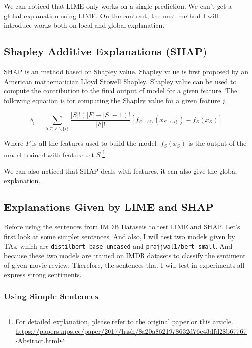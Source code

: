 \documentclass{article}[12pt]
\begin{document}
We can noticed that LIME only works on a single prediction. We can't get a global explanation using LIME. On the contrast, the next method I will introduce works both on local and global explanation.

\subsection{Shapley Additive Explanations (SHAP)}

SHAP is an method based on Shapley value. Shapley value is first proposed by an American mathematician Lloyd Stowell Shapley. Shapley value can be used to compute the contribution to the final output of model for a given feature. The following equation is for computing the Shapley value for a given feature $j$.

\begin{equation}
\phi_{i}=\sum_{S \subseteq F \backslash\{i\}} \frac{|S| !(|F|-|S|-1) !}{|F| !}\left[f_{S \cup\{i\}}\left(x_{S \cup\{i\}}\right)-f_{S}\left(x_{S}\right)\right]
\end{equation}

Where $F$ is all the features used to build the model. $f_{S}(x_{S})$ is the output of the model trained with feature set $S$.\footnote{For detailed explanation, please refer to the original paper or this article. \url{https://papers.nips.cc/paper/2017/hash/8a20a8621978632d76c43dfd28b67767-Abstract.html}}

We can also noticed that SHAP deals with features, it can also give the global explanation.

\subsection{Explanations Given by LIME and SHAP}

Before using the sentences from IMDB Datasets to test LIME and SHAP. Let's first look at some simpler sentences. And also, I will test two models given by TAs, which are \texttt{distilbert-base-uncased} and \texttt{prajjwal1/bert-small}. And because these two models are trained on IMDB datasets to classify the sentiment of given movie review. Therefore, the sentences that I will test in experiments all express strong sentiments.

\subsubsection{Using Simple Sentences}
\end{document}
